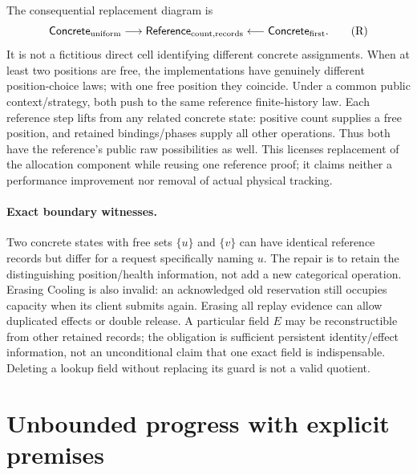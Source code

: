 \documentclass[11pt]{article}
\begin{document}
The consequential replacement diagram is
\[
 \mathsf{Concrete}_{\rm uniform}\longrightarrow
 \mathsf{Reference}_{\rm count,records}
 \longleftarrow\mathsf{Concrete}_{\rm first}.
 \tag{R}\label{eq:replacement-cospan}
\]
It is not a fictitious direct cell identifying different concrete assignments. When at least two positions are free, the implementations have genuinely different position-choice laws; with one free position they coincide. Under a common public context/strategy, both push to the same reference finite-history law. Each reference step lifts from any related concrete state: positive count supplies a free position, and retained bindings/phases supply all other operations. Thus both have the reference's public raw possibilities as well. This licenses replacement of the allocation component while reusing one reference proof; it claims neither a performance improvement nor removal of actual physical tracking.

\paragraph{Exact boundary witnesses.} Two concrete states with free sets $\{u\}$ and $\{v\}$ can have identical reference records but differ for a request specifically naming $u$. The repair is to retain the distinguishing position/health information, not add a new categorical operation. Erasing Cooling is also invalid: an acknowledged old reservation still occupies capacity when its client submits again. Erasing all replay evidence can allow duplicated effects or double release. A particular field $E$ may be reconstructible from other retained records; the obligation is sufficient persistent identity/effect information, not an unconditional claim that one exact field is indispensable. Deleting a lookup field without replacing its guard is not a valid quotient.

\section{Unbounded progress with explicit premises}
\end{document}
